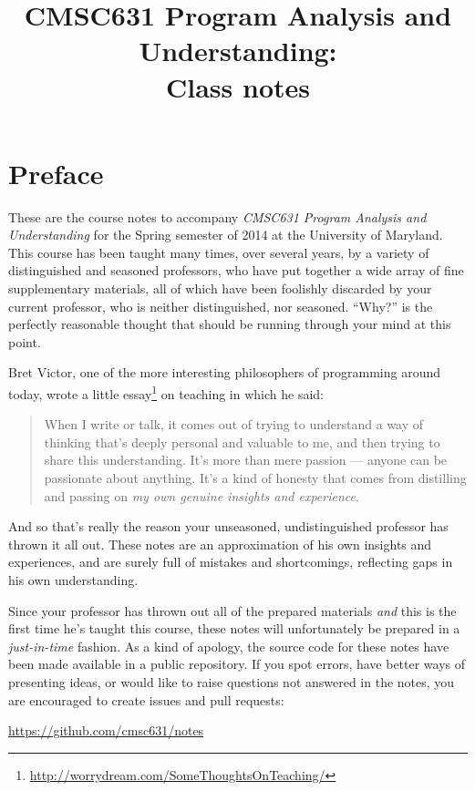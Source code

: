 \documentclass[11pt]{article}
\title{CMSC631 Program Analysis and Understanding:\\
  Class notes}
\begin{document}
\maketitle
\tableofcontents


\newpage
\section*{Preface}
%

These are the course notes to accompany \emph{CMSC631 Program Analysis
  and Understanding} for the Spring semester of 2014 at the University
of Maryland.
%
This course has been taught many times, over several years, by a
variety of distinguished and seasoned professors, who have put
together a wide array of fine supplementary materials, all of which
have been foolishly discarded by your current professor, who is
neither distinguished, nor seasoned.  ``Why?'' is the perfectly
reasonable thought that should be running through your mind at this
point.

Bret Victor, one of the more interesting philosophers of programming
around today, wrote a little
essay\footnote{\url{http://worrydream.com/SomeThoughtsOnTeaching/}} on
teaching in which he said:
%
\begin{quote}
When I write or talk, it comes out of trying to understand a way of
thinking that's deeply personal and valuable to me, and then trying to
share this understanding. It's more than mere passion --- anyone can
be passionate about anything. It's a kind of honesty that comes from
distilling and passing on \emph{my own genuine insights and
  experience}.
\end{quote}
And so that's really the reason your unseasoned, undistinguished
professor has thrown it all out.  These notes are an approximation of
his own insights and experiences, and are surely full of mistakes and
shortcomings, reflecting gaps in his own understanding.

Since your professor has thrown out all of the prepared materials
\emph{and} this is the first time he's taught this course, these notes
will unfortunately be prepared in a \emph{just-in-time} fashion.  As a
kind of apology, the source code for these notes have been made
available in a public repository.  If you spot errors, have better
ways of presenting ideas, or would like to raise questions not
answered in the notes, you are encouraged to create issues and pull
requests:

\begin{center}
\url{https://github.com/cmsc631/notes}
\end{center}
\end{document}
